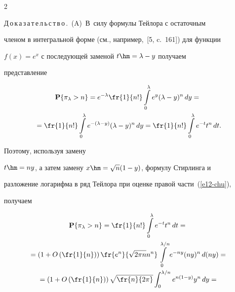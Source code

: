 \begin{multicols}{2}
\medskip





\noindent


Д\,о\,к\,а\,з\,а\,т\,е\,л\,ь\,с\,т\,в\,о\,.\ (A)~В~силу формулы Тейлора с остаточным


членом в интегральной форме (см., например,~[5, c.~161]) для функции


$f(x)=e^x$ с последующей заменой  $t\hm=\lambda-y$  получаем


пред\-став\-ле\-ние





\noindent


\begin{multline}


\mathbf{P}\{\pi_{\lambda}>n\}=e^{-\lambda}\fr{1}{n!}


\int\limits_0^{\lambda}e^y(\lambda-y)^n\,dy={}\\


{}=


\fr{1}{n!}\int\limits_0^{\lambda}e^{-(\lambda-y)}(\lambda-y)^n\,dy=


\fr{1}{n!}\int\limits_0^{\lambda}e^{-t}t^n\,dt.\label{e12-chu}


\end{multline}


 Поэтому, используя замену


$t\hm=ny$, а затем замену $x\hm=\sqrt{n}(1-y)$, формулу Стирлинга и


разложение логарифма в ряд Тейлора при оценке правой час\-ти~(\ref{e12-chu}),


получаем





\noindent


\begin{multline*}


\mathbf{P}\{\pi_{\lambda}>n\}=\fr{1}{n!}\int\limits_0^{\lambda}e^{-t}t^n\,dt={}\\


{}=


\left(1+O\left(\fr{1}{n}\right)\right)


\fr{e^n}{\sqrt{2\pi n}n^n}\int\limits_0^{{\lambda}/{n}}e^{-ny}(ny)^n\,d(ny)={}\\


{}=


\left(1+O\left(\fr{1}{n}\right)\right) \sqrt{\fr{n}{2\pi}}


\int_0^{{\lambda}/{n}}e^{n(1-y)}y^n\,dy={}\\



\end{multline*}
\end{multicols}

